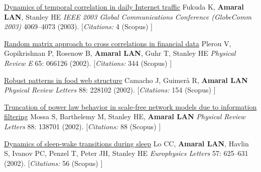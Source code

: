 \NumberedItem{\makebox[0.8cm][r]{[47]}}
\href{/people/amaral/dynamics-of-temporal-correlation-in-daily-internet-traffic}
{Dynamics of temporal correlation in daily Internet traffic}
\newline
Fukuda K, {\textbf{Amaral LAN}}, Stanley HE
\newline
\textit{IEEE 2003 Global Communications Conference (GlobeComm 2003)}
4069--4073 (2003).
    [{\em{Citations:}}  4 (Scopus) ]
\newline
\Gap
~
\Gap

\NumberedItem{\makebox[0.8cm][r]{[46]}}
\href{/people/amaral/random-matrix-approach-to-cross-correlations-in-financial-data}
{Random matrix approach to cross correlations in financial data}
\newline
Plerou V, Gopikrishnan P, Rosenow B, {\textbf{Amaral LAN}}, Guhr T, Stanley HE
\newline
\textit{Physical Review E}
    65:
066126 (2002).
    [{\em{Citations:}}  344 (Scopus) ]
\newline
\Gap
~
\Gap

\NumberedItem{\makebox[0.8cm][r]{[45]}}
\href{/people/amaral/robust-patterns-in-food-web-structure}
{Robust patterns in food web structure}
\newline
Camacho J, Guimer\`a R, {\textbf{Amaral LAN}}
\newline
\textit{Physical Review Letters}
    88:
228102 (2002).
    [{\em{Citations:}}  154 (Scopus) ]
\newline
\Gap
~
\Gap

\NumberedItem{\makebox[0.8cm][r]{[44]}}
\href{/people/amaral/truncation-of-power-law-behavior-in-scale-free-network-models-due-to-information-filtering}
{Truncation of power law behavior in scale-free network models due to information filtering}
\newline
Mossa S, Barthelemy M, Stanley HE, {\textbf{Amaral LAN}}
\newline
\textit{Physical Review Letters}
    88:
138701 (2002).
    [{\em{Citations:}}  88 (Scopus) ]
\newline
\Gap
~
\Gap

\NumberedItem{\makebox[0.8cm][r]{[43]}}
\href{/people/amaral/dynamics-of-sleep-wake-transitions-during-sleep}
{Dynamics of sleep-wake transitions during sleep}
\newline
Lo CC, {\textbf{Amaral LAN}}, Havlin S, Ivanov PC, Penzel T, Peter JH, Stanley HE
\newline
\textit{Europhysics Letters}
    57:
625--631 (2002).
    [{\em{Citations:}}  56 (Scopus) ]
\newline
\Gap
~
\Gap

